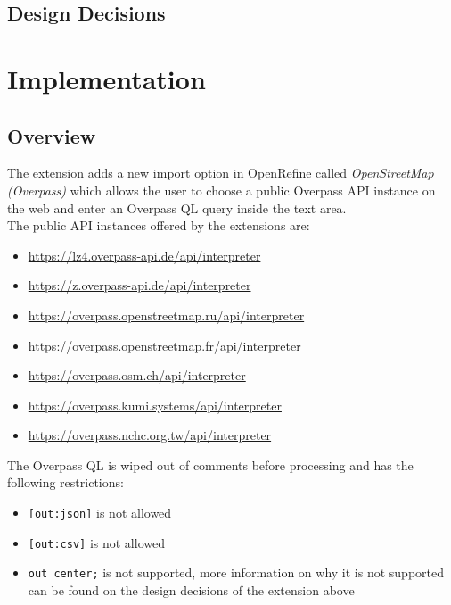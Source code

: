 \subsection{Design Decisions}
\lipsum[18-20]
\pagebreak
\section{Implementation}
\subsection{Overview}
The extension adds a new import option in OpenRefine called \textit{OpenStreetMap (Overpass)} which allows the user to choose a
public Overpass API instance on the web and enter an Overpass QL query inside the text area.\\
\newline
The public API instances offered by the extensions are:
\begin{itemize}
    \item \href{https://lz4.overpass-api.de/api/interpreter}{https://lz4.overpass-api.de/api/interpreter}
    \item \href{https://z.overpass-api.de/api/interpreter}{https://z.overpass-api.de/api/interpreter}
    \item \href{https://overpass.openstreetmap.ru/api/interpreter}{https://overpass.openstreetmap.ru/api/interpreter}
    \item \href{https://overpass.openstreetmap.fr/api/interpreter}{https://overpass.openstreetmap.fr/api/interpreter}
    \item \href{https://overpass.osm.ch/api/interpreter}{https://overpass.osm.ch/api/interpreter}
    \item \href{https://overpass.kumi.systems/api/interpreter}{https://overpass.kumi.systems/api/interpreter}
    \item \href{https://overpass.nchc.org.tw/api/interpreter}{https://overpass.nchc.org.tw/api/interpreter}
\end{itemize}
The Overpass QL is wiped out of comments before processing and has the following restrictions:
\begin{itemize}
    \item \texttt{[out:json]} is not allowed
    \item \texttt{[out:csv]} is not allowed
    \item \texttt{out center;} is not supported, more information on why it is not supported can be found
    on the design decisions of the extension above
\end{itemize}
